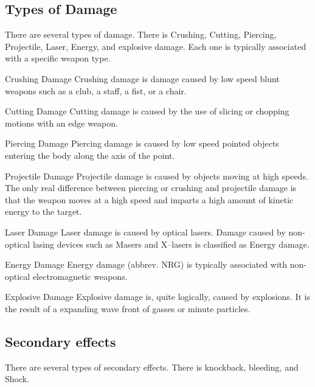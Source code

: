 \subsection{Types of Damage}

There are several types of damage. There is Crushing, Cutting, 
Piercing, Projectile, Laser, Energy, and explosive damage. Each one 
is typically associated with a specific weapon type. 

\begin{relate}
	\item[Crushing Damage]
	Crushing damage is damage caused by low speed blunt weapons such as 
	a club, a staff, a fist, or a chair. 

	\item[Cutting Damage]
	Cutting damage is caused by the use of slicing or chopping motions 
	with an edge weapon. 

	\item[Piercing Damage]
	Piercing damage is caused by low speed pointed objects entering the 
	body along the axis of the point. 

	\item[Projectile Damage]
	Projectile damage is caused by objects moving at high speeds. The 
	only real difference between piercing or crushing and projectile 
	damage is that the weapon moves at a high speed and imparts a
	high amount of kinetic energy to the target.

	\item[Laser Damage]
	Laser damage is caused by optical lasers. Damage caused by 
	non-optical lasing devices such as Masers and X--lasers is classified 
	as Energy damage. 

	\item[Energy Damage]
	Energy damage (abbrev. NRG) is typically associated with non-optical 
	electromagnetic weapons. 

	\item[Explosive Damage]
	Explosive damage is, quite logically, caused by explosions. It is 
	the result of a expanding wave front of gasses or minute particles.

\end{relate}

\subsection{Secondary effects}

There are several types of secondary effects. There is knockback, 
bleeding, and Shock.

